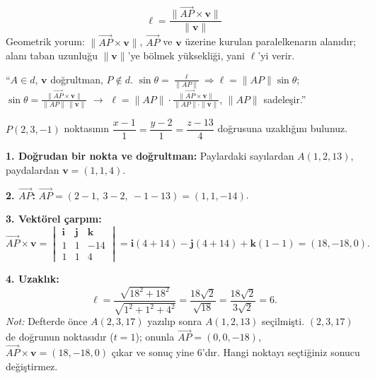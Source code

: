 \begin{teorem}
\[ \boxed{\ \ell=\frac{\|\overrightarrow{AP}\times\mathbf v\|}{\|\mathbf v\|}\ } \]
Geometrik yorum: $\|\overrightarrow{AP}\times\mathbf v\|$, $\overrightarrow{AP}$ ve $\mathbf v$ üzerine kurulan paralelkenarın alanıdır; alanı taban uzunluğu $\|\mathbf v\|$'ye bölmek yüksekliği, yani $\ell$'yi verir.
\end{teorem}

\begin{tahta}
``$A\in d$, $\mathbf v$ doğrultman, $P\notin d$. $\sin\theta=\frac{\ell}{\|AP\|}\Rightarrow\ell=\|AP\|\sin\theta$;
$\sin\theta=\frac{\|\overrightarrow{AP}\times\mathbf v\|}{\|AP\|\,\|\mathbf v\|}$ $\to$ $\ell=\|AP\|\cdot\frac{\|\overrightarrow{AP}\times\mathbf v\|}{\|AP\|\cdot\|\mathbf v\|}$, $\|AP\|$ sadeleşir.''
\end{tahta}

\begin{soru}
$P(2,3,-1)$ noktasının $\dfrac{x-1}{1}=\dfrac{y-2}{1}=\dfrac{z-13}{4}$ doğrusuna uzaklığını bulunuz.
\end{soru}
\begin{cevap}
\textbf{1. Doğrudan bir nokta ve doğrultman:} Paylardaki sayılardan $A(1,2,13)$, paydalardan $\mathbf v=(1,1,4)$.

\textbf{2. $\overrightarrow{AP}$:} $\overrightarrow{AP}=(2-1,\ 3-2,\ -1-13)=(1,1,-14)$.

\textbf{3. Vektörel çarpım:}
\[ \overrightarrow{AP}\times\mathbf v=\begin{vmatrix}\mathbf i&\mathbf j&\mathbf k\\1&1&-14\\1&1&4\end{vmatrix}
=\mathbf i(4+14)-\mathbf j(4+14)+\mathbf k(1-1)=(18,-18,0). \]

\textbf{4. Uzaklık:}
\[ \ell=\frac{\sqrt{18^2+18^2}}{\sqrt{1^2+1^2+4^2}}=\frac{18\sqrt2}{\sqrt{18}}=\frac{18\sqrt2}{3\sqrt2}=\boxed{6}. \]
\textit{Not:} Defterde önce $A(2,3,17)$ yazılıp sonra $A(1,2,13)$ seçilmişti. $(2,3,17)$ de doğrunun noktasıdır ($t=1$); onunla $\overrightarrow{AP}=(0,0,-18)$, $\overrightarrow{AP}\times\mathbf v=(18,-18,0)$ çıkar ve sonuç yine $6$'dır. Hangi noktayı seçtiğiniz sonucu değiştirmez.
\end{cevap}

